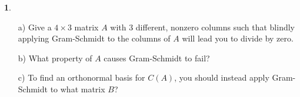 \documentclass{article}
\theoremstyle{definition}
\newtheorem{prob}{}
\begin{document}
\begin{prob}
	\begin{itemize}
		\item[a)] Give a $4 \times 3$ matrix $A$ with 3 different, nonzero columns such that blindly applying Gram-Schmidt to the columns of $A$ will lead you to divide by zero.
		\item[b)] What property of $A$ causes Gram-Schmidt to fail?
		\item[c)] To find an orthonormal basis for $C(A)$, you should instead apply Gram-Schmidt to what matrix $B$?
	\end{itemize}
\end{prob}

%
%
\end{document}
